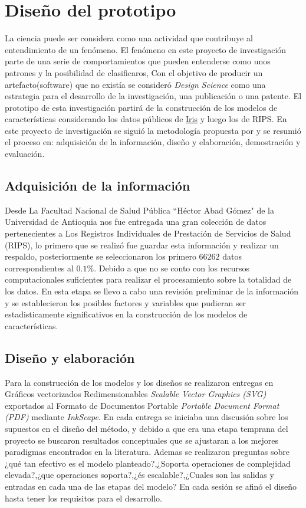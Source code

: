 \section{Diseño del prototipo}
La ciencia puede ser considera como una actividad que contribuye al entendimiento de un fenómeno. El fenómeno en este proyecto de investigación parte de una serie de comportamientos que pueden entenderse como unos patrones y la posibilidad de clasificaros,  Con el objetivo de producir un artefacto(software) que no existía se consideró \textit{Design Science} \cite{Vaishnavi2013} como una estrategia para el desarrollo de la investigación, una publicación o una patente. El prototipo de esta investigación partirá de la construcción de los modelos de características considerando los datos públicos de \href{http://archive.ics.uci.edu/ml/datasets/Iris}{Iris} y luego los de RIPS.
En este proyecto de investigación se siguió la metodología propuesta por \cite{Vaishnavi2013} y se resumió el proceso en: adquisición de la información, diseño y elaboración, demostración y evaluación.
 
\subsection{Adquisición de la información}
Desde La Facultad Nacional de Salud Pública ``Héctor Abad Gómez" de la Universidad de Antioquia nos fue entregada una gran colección de datos pertenecientes a  Los Registros Individuales de Prestación de Servicios de Salud (RIPS), lo primero que se realizó fue guardar esta información y realizar un respaldo, posteriormente se seleccionaron los primero $66262$ datos correspondientes al $0.1\%$. Debido a que no se conto con los recursos computacionales suficientes para realizar el procesamiento sobre la totalidad de los datos. En esta etapa se llevo a cabo una revisión preliminar de la información y se establecieron los posibles factores y variables que pudieran ser estadisticamente significativos en la construcción de los modelos de características. 

\subsection{Diseño y elaboración}
Para la construcción de los modelos y los diseños se realizaron entregas en Gráficos vectorizados Redimensionables \textit{Scalable Vector Graphics (SVG)} exportados al Formato de Documentos Portable \textit{Portable Document Format (PDF)} mediante \textit{InkScape}. En cada entrega se iniciaba una discusión sobre los supuestos en el diseño del método, y debido a que era una etapa temprana del proyecto se buscaron resultados conceptuales que se ajustaran a los mejores paradigmas encontrados en la literatura. Ademas se realizaron preguntas sobre ¿qué tan efectivo es el modelo planteado?,¿Soporta operaciones de complejidad elevada?,¿que operaciones soporta?,¿és escalable?,¿Cuales son las salidas y entradas en cada una de las etapas del modelo? En cada sesión se afinó el diseño hasta tener los requisitos para el desarrollo.
